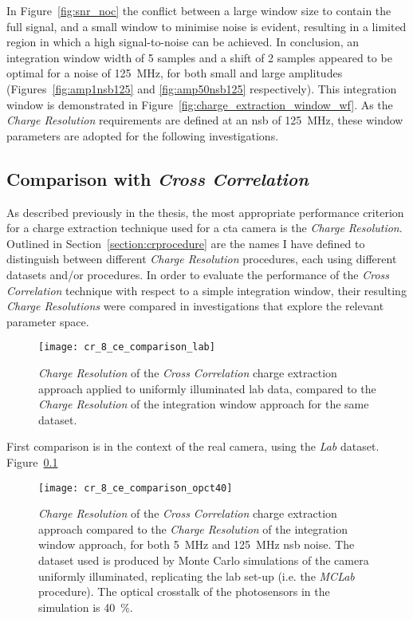 In Figure~\ref{fig:snr_noc} the conflict between a large window size to contain the full signal, and a small window to minimise noise is evident, resulting in a limited region in which a high signal-to-noise can be achieved. In conclusion, an integration window width of 5 samples and a shift of 2 samples appeared to be optimal for a noise of \SI{125}{MHz}, for both small and large amplitudes (Figures~\ref{fig:amp1nsb125} and \ref{fig:amp50nsb125} respectively). This integration window is demonstrated in Figure~\ref{fig:charge_extraction_window_wf}. As the \textit{Charge Resolution} requirements are defined at an \gls{nsb} of \SI{125}{MHz}, these window parameters are adopted for the following investigations.

\subsection{Comparison with \textit{Cross Correlation}}

As described previously in the thesis, the most appropriate performance criterion for a charge extraction technique used for a \gls{cta} camera is the \textit{Charge Resolution}. Outlined in Section~\ref{section:crprocedure} are the names I have defined to distinguish between different \textit{Charge Resolution} procedures, each using different datasets and/or procedures. In order to evaluate the performance of the \textit{Cross Correlation} technique with respect to a simple integration window, their resulting \textit{Charge Resolutions} were compared in investigations that explore the relevant parameter space.

\begin{figure}
  \texttt{[image: cr\_8\_ce\_comparison\_lab]}
  \caption[\textit{Charge Resolution} comparison between Cross Correlation and Window Integration for \textit{Lab} data.]{\textit{Charge Resolution} of the \textit{Cross Correlation} charge extraction approach applied to uniformly illuminated lab data, compared to the \textit{Charge Resolution} of the integration window approach for the same dataset.}
  \label{fig:cr_ce_lab}
\end{figure}

First comparison is in the context of the real camera, using the \textit{Lab} dataset. Figure~\ref{}

\begin{figure}
  \texttt{[image: cr\_8\_ce\_comparison\_opct40]}
  \caption[\textit{Charge Resolution} comparison between Cross Correlation and Window Integration for \textit{MCLab} data with an optical crosstalk of \SI{40}{\percent}.]{\textit{Charge Resolution} of the \textit{Cross Correlation} charge extraction approach compared to the \textit{Charge Resolution} of the integration window approach, for both \SI{5}{MHz} and \SI{125}{MHz} \gls{nsb} noise. The dataset used is produced by Monte Carlo simulations of the camera uniformly illuminated, replicating the lab set-up (i.e. the \textit{MCLab} procedure). The optical crosstalk of the photosensors in the simulation is \SI{40}{\percent}.}
  \label{fig:cr_ce_mclab_opct40}
\end{figure}

